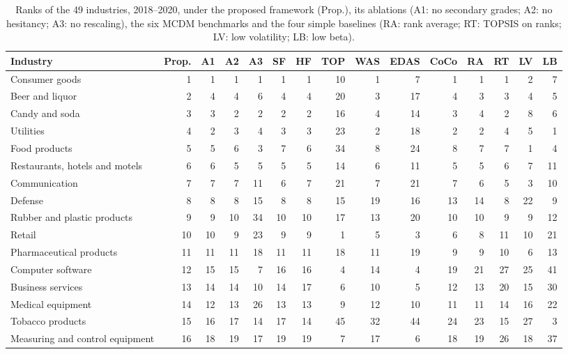 \begin{table}[!htbp]
\centering
\scriptsize
\caption{Ranks of the 49 industries, 2018--2020, under the proposed framework (Prop.), its ablations (A1: no secondary grades; A2: no hesitancy; A3: no rescaling), the six MCDM benchmarks and the four simple baselines (RA: rank average; RT: TOPSIS on ranks; LV: low volatility; LB: low beta).}\label{tab:ranksfull}
\begin{adjustbox}{max width=\textwidth}
\begin{tabular}{lrrrrrrrrrrrrrr}
\toprule
Industry & Prop. & A1 & A2 & A3 & SF & HF & TOP & WAS & EDAS & CoCo & RA & RT & LV & LB \\
\midrule
Consumer goods & 1 & 1 & 1 & 1 & 1 & 1 & 10 & 1 & 7 & 1 & 1 & 1 & 2 & 7 \\
Beer and liquor & 2 & 4 & 4 & 6 & 4 & 4 & 20 & 3 & 17 & 4 & 3 & 3 & 4 & 5 \\
Candy and soda & 3 & 3 & 2 & 2 & 2 & 2 & 16 & 4 & 14 & 3 & 4 & 2 & 8 & 6 \\
Utilities & 4 & 2 & 3 & 4 & 3 & 3 & 23 & 2 & 18 & 2 & 2 & 4 & 5 & 1 \\
Food products & 5 & 5 & 6 & 3 & 7 & 6 & 34 & 8 & 24 & 8 & 7 & 7 & 1 & 4 \\
Restaurants, hotels and motels & 6 & 6 & 5 & 5 & 5 & 5 & 14 & 6 & 11 & 5 & 5 & 6 & 7 & 11 \\
Communication & 7 & 7 & 7 & 11 & 6 & 7 & 21 & 7 & 21 & 7 & 6 & 5 & 3 & 10 \\
Defense & 8 & 8 & 8 & 15 & 8 & 8 & 15 & 19 & 16 & 13 & 14 & 8 & 22 & 9 \\
Rubber and plastic products & 9 & 9 & 10 & 34 & 10 & 10 & 17 & 13 & 20 & 10 & 10 & 9 & 9 & 12 \\
Retail & 10 & 10 & 9 & 23 & 9 & 9 & 1 & 5 & 3 & 6 & 8 & 11 & 10 & 21 \\
Pharmaceutical products & 11 & 11 & 11 & 18 & 11 & 11 & 18 & 11 & 19 & 9 & 9 & 10 & 6 & 13 \\
Computer software & 12 & 15 & 15 & 7 & 16 & 16 & 4 & 14 & 4 & 19 & 21 & 27 & 25 & 41 \\
Business services & 13 & 14 & 14 & 10 & 14 & 17 & 6 & 10 & 5 & 12 & 13 & 20 & 15 & 30 \\
Medical equipment & 14 & 12 & 13 & 26 & 13 & 13 & 9 & 12 & 10 & 11 & 11 & 14 & 16 & 22 \\
Tobacco products & 15 & 16 & 17 & 14 & 17 & 14 & 45 & 32 & 44 & 24 & 23 & 15 & 27 & 3 \\
Measuring and control equipment & 16 & 18 & 19 & 17 & 19 & 19 & 7 & 17 & 6 & 18 & 19 & 26 & 18 & 37 \\

\end{tabular}
\end{adjustbox}
\end{table}
